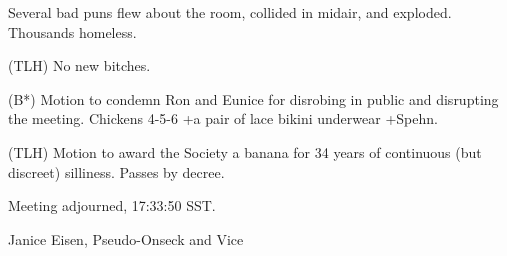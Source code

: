 \documentclass[12pt]{article}
\begin{document}
Several bad puns flew about the room, collided in midair, and exploded. Thousands homeless.

(TLH) No new bitches.

(B*) Motion to condemn Ron and Eunice for disrobing in public and disrupting the meeting. Chickens 4-5-6 +a pair of lace bikini underwear +Spehn.

(TLH) Motion to award the Society a banana for 34 years of continuous (but discreet) silliness. Passes by decree.

\vspace{12pt}

\noindent
Meeting adjourned, 17:33:50 SST.

\vspace{18pt}

\centerline{Janice Eisen, Pseudo-Onseck and Vice}
\end{document}
